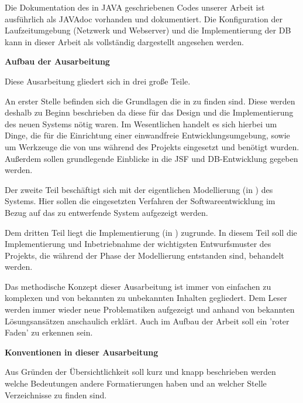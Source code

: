Die Dokumentation des in \gls{JAVA} geschriebenen Codes unserer Arbeit ist ausführlich als \gls{JAVAdoc} vorhanden und dokumentiert. Die Konfiguration der Laufzeitumgebung (Netzwerk und Webserver) und die Implementierung der \ac{DB} kann in dieser Arbeit als vollständig dargestellt angesehen werden.

\textbf{Aufbau der Ausarbeitung}

Diese Ausarbeitung gliedert sich in drei große Teile. 

An erster Stelle befinden sich die Grundlagen die in  zu finden sind. Diese werden deshalb zu Beginn beschrieben da diese für das Design und die Implementierung des neuen Systems nötig waren.
Im Wesentlichen handelt es sich hierbei um Dinge, die für die Einrichtung einer einwandfreie Entwicklungsumgebung, sowie um Werkzeuge die von uns während des Projekts eingesetzt und benötigt wurden. Außerdem sollen grundlegende Einblicke in die \ac{JSF} und \ac{DB}-Entwicklung gegeben werden.

Der zweite Teil beschäftigt sich mit der eigentlichen Modellierung (in ) des Systems. Hier sollen die eingesetzten Verfahren der Softwareentwicklung im Bezug auf das zu entwerfende System aufgezeigt werden.

Dem dritten Teil liegt die Implementierung (in ) zugrunde. 
In diesem Teil soll die Implementierung und Inbetriebnahme der wichtigsten Entwurfsmuster des Projekts, die während der Phase der Modellierung entstanden sind, behandelt werden. 

Das methodische Konzept dieser Ausarbeitung ist immer von einfachen zu komplexen und von bekannten zu unbekannten Inhalten gegliedert. Dem Leser werden immer wieder neue Problematiken aufgezeigt und anhand von bekannten Lösungsansätzen anschaulich erklärt. Auch im Aufbau der Arbeit soll ein 'roter Faden' zu erkennen sein. 

\textbf{Konventionen in dieser Ausarbeitung}

Aus Gründen der Übersichtlichkeit soll kurz und knapp beschrieben werden welche Bedeutungen andere Formatierungen haben und an welcher Stelle Verzeichnisse zu finden sind.

